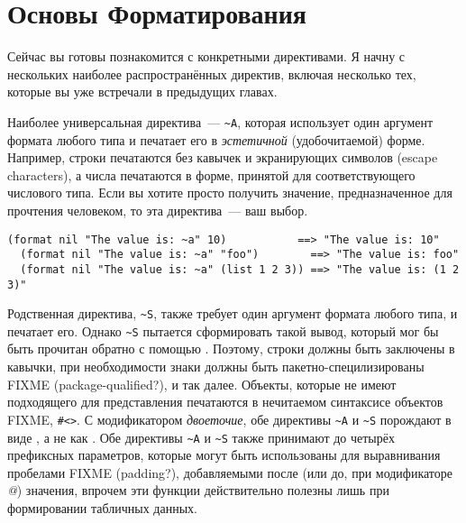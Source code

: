\section{Основы Форматирования}

Сейчас вы готовы познакомится с конкретными директивами. Я начну с нескольких наиболее
распространённых директив, включая несколько тех, которые вы уже встречали в предыдущих
главах.

Наиболее универсальная директива~--- \lstinline!~A!, которая использует один аргумент
формата любого типа и печатает его в \textit{эстетичной} (удобочитаемой) форме. Например,
строки печатаются без кавычек и экранирующих символов (escape characters), а числа
печатаются в форме, принятой для соответствующего числового типа. Если вы хотите просто
получить значение, предназначенное для прочтения человеком, то эта директива~--- ваш выбор.

\begin{lstlisting}[style=lisprepl]
  (format nil "The value is: ~a" 10)           ==> "The value is: 10"
  (format nil "The value is: ~a" "foo")        ==> "The value is: foo"
  (format nil "The value is: ~a" (list 1 2 3)) ==> "The value is: (1 2 3)"
\end{lstlisting}

Родственная директива, \lstinline!~S!, также требует один аргумент формата любого типа, и
печатает его. Однако \lstinline!~S!  пытается сформировать такой вывод, который мог бы
быть прочитан обратно с помощью . Поэтому, строки должны быть заключены в
кавычки, при необходимости знаки должны быть пакетно-специлизированы FIXME
(package-qualified?), и так далее. Объекты, которые не имеют подходящего для 
представления печатаются в нечитаемом синтаксисе объектов FIXME, \lstinline!#<>!. С
модификатором \textit{двоеточие}, обе директивы \lstinline!~A! и \lstinline!~S!  порождают
 в виде \code{()}, а не как . Обе директивы \lstinline!~A! и
\lstinline!~S! также принимают до четырёх префиксных параметров, которые могут быть
использованы для выравнивания пробелами FIXME (padding?), добавляемыми после (или до, при
модификаторе \textit{@}) значения, впрочем эти функции действительно полезны лишь при
формировании табличных данных.

